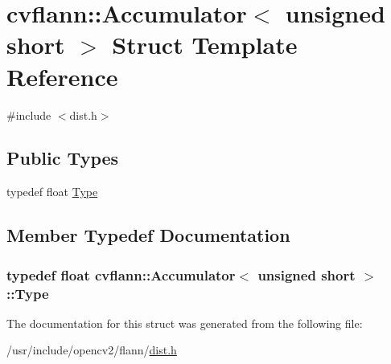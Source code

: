 \hypertarget{structcvflann_1_1Accumulator_3_01unsigned_01short_01_4}{\section{cvflann\-:\-:Accumulator$<$ unsigned short $>$ Struct Template Reference}
\label{structcvflann_1_1Accumulator_3_01unsigned_01short_01_4}
}


{\ttfamily \#include $<$dist.\-h$>$}

\subsection*{Public Types}
\begin{DoxyCompactItemize}
\item 
typedef float \hyperlink{structcvflann_1_1Accumulator_3_01unsigned_01short_01_4_af8a575320dfd46a6f3c42a774793ad5e}{Type}
\end{DoxyCompactItemize}


\subsection{Member Typedef Documentation}
\hypertarget{structcvflann_1_1Accumulator_3_01unsigned_01short_01_4_af8a575320dfd46a6f3c42a774793ad5e}{
\subsubsection[{Type}]{\setlength{\rightskip}{0pt plus 5cm}typedef float {\bf cvflann\-::\-Accumulator}$<$ unsigned short $>$\-::{\bf Type}}}\label{structcvflann_1_1Accumulator_3_01unsigned_01short_01_4_af8a575320dfd46a6f3c42a774793ad5e}


The documentation for this struct was generated from the following file\-:\begin{DoxyCompactItemize}
\item 
/usr/include/opencv2/flann/\hyperlink{dist_8h}{dist.\-h}\end{DoxyCompactItemize}
